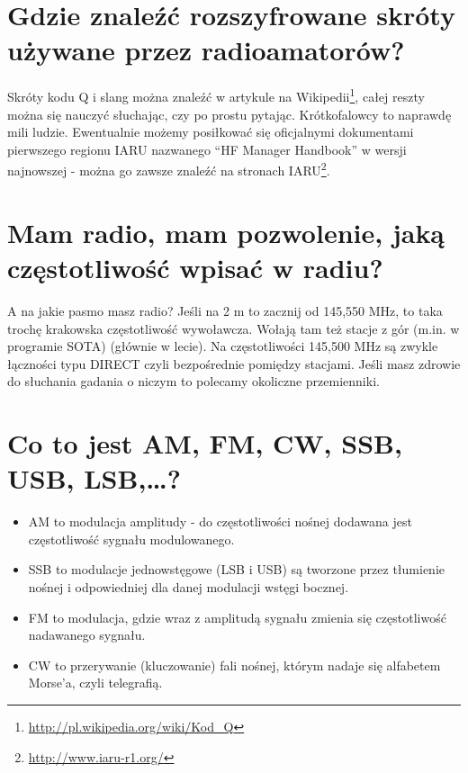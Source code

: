 \documentclass[a4paper,12pt]{article}
\begin{document}
\section{Gdzie znaleźć rozszyfrowane skróty używane przez radioamatorów?}
Skróty kodu Q i slang można znaleźć w artykule na Wikipedii\footnote{\url{http://pl.wikipedia.org/wiki/Kod_Q}}, całej reszty można się nauczyć słuchając, czy po prostu pytając. Krótkofalowcy to naprawdę mili ludzie. Ewentualnie możemy posiłkować się oficjalnymi dokumentami pierwszego regionu IARU nazwanego “HF Manager Handbook” w wersji najnowszej - można go zawsze znaleźć na stronach IARU\footnote{\url{http://www.iaru-r1.org/}}.

\section{Mam radio, mam pozwolenie, jaką częstotliwość wpisać w radiu?}
A na jakie pasmo masz radio?
Jeśli na 2 m to zacznij od 145,550 MHz, to taka trochę krakowska częstotliwość wywoławcza. Wołają tam też stacje z gór (m.in. w programie SOTA) (głównie w lecie). Na częstotliwości 145,500 MHz są zwykle łączności typu DIRECT czyli bezpośrednie pomiędzy stacjami. Jeśli masz zdrowie do słuchania gadania o niczym to polecamy okoliczne przemienniki.

\section{Co to jest AM, FM, CW, SSB, USB, LSB,…?}
\begin{itemize}
\item AM to modulacja amplitudy - do częstotliwości nośnej dodawana jest częstotliwość sygnału modulowanego. 
\item SSB to modulacje jednowstęgowe (LSB i USB) są tworzone przez tłumienie nośnej i odpowiedniej dla danej modulacji wstęgi bocznej. 
\item FM to modulacja, gdzie wraz z amplitudą sygnału zmienia się częstotliwość nadawanego sygnału. 
\item CW to przerywanie (kluczowanie) fali nośnej, którym nadaje się alfabetem Morse'a, czyli telegrafią. \end{itemize}
\end{document}
